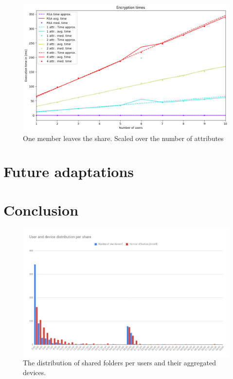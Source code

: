 \begin{figure}[!ht]
\centering
    \includegraphics[width=\linewidth]{img/eval-leave/leave_attr_1_users_2.png}
    \caption{One member leaves the share. Scaled over the number of attributes}
    \label{fig:member-leave}
\end{figure}

\section{Future adaptations}


\section{Conclusion}
\begin{figure}[!t]
\centering
    \includegraphics[width=1.0\linewidth]{img/share_distribution_bdirve.png}
    \caption{The distribution of shared folders per users and their aggregated devices.}
    \label{fig:evaluation-share-distribution}
\end{figure}
